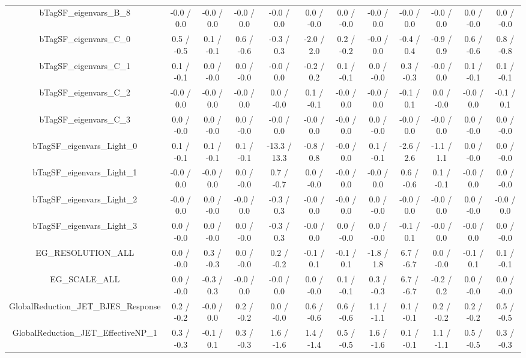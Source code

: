 \begin{table}[htbp]
\begin{center}
\begin{tabular}{|c|c|c|c|c|c|c|c|c|c|c|c|}
  bTagSF_eigenvars_B_8 & -0.0 / 0.0 & -0.0 / 0.0 & -0.0 / 0.0 & -0.0 / 0.0 & 0.0 / -0.0 & 0.0 / -0.0 & -0.0 / 0.0 & -0.0 / 0.0 & -0.0 / 0.0 & 0.0 / -0.0 & 0.0 / -0.0 \\ 
  bTagSF_eigenvars_C_0 & 0.5 / -0.5 & 0.1 / -0.1 & 0.6 / -0.6 & -0.3 / 0.3 & -2.0 / 2.0 & 0.2 / -0.2 & -0.0 / 0.0 & -0.4 / 0.4 & -0.9 / 0.9 & 0.6 / -0.6 & 0.8 / -0.8 \\ 
  bTagSF_eigenvars_C_1 & 0.1 / -0.1 & 0.0 / -0.0 & 0.0 / -0.0 & -0.0 / 0.0 & -0.2 / 0.2 & 0.1 / -0.1 & 0.0 / -0.0 & 0.3 / -0.3 & -0.0 / 0.0 & 0.1 / -0.1 & 0.1 / -0.1 \\ 
  bTagSF_eigenvars_C_2 & -0.0 / 0.0 & -0.0 / 0.0 & -0.0 / 0.0 & 0.0 / -0.0 & 0.1 / -0.1 & -0.0 / 0.0 & -0.0 / 0.0 & -0.1 / 0.1 & 0.0 / -0.0 & -0.0 / 0.0 & -0.1 / 0.1 \\ 
  bTagSF_eigenvars_C_3 & 0.0 / -0.0 & 0.0 / -0.0 & 0.0 / -0.0 & -0.0 / 0.0 & -0.0 / 0.0 & -0.0 / 0.0 & 0.0 / -0.0 & -0.0 / 0.0 & -0.0 / 0.0 & 0.0 / -0.0 & 0.0 / -0.0 \\ 
  bTagSF_eigenvars_Light_0 & 0.1 / -0.1 & 0.1 / -0.1 & 0.1 / -0.1 & -13.3 / 13.3 & -0.8 / 0.8 & -0.0 / 0.0 & 0.1 / -0.1 & -2.6 / 2.6 & -1.1 / 1.1 & 0.0 / -0.0 & 0.0 / -0.0 \\ 
  bTagSF_eigenvars_Light_1 & -0.0 / 0.0 & -0.0 / 0.0 & 0.0 / -0.0 & 0.7 / -0.7 & 0.0 / -0.0 & -0.0 / 0.0 & -0.0 / 0.0 & 0.6 / -0.6 & 0.1 / -0.1 & -0.0 / 0.0 & 0.0 / -0.0 \\ 
  bTagSF_eigenvars_Light_2 & -0.0 / 0.0 & 0.0 / -0.0 & -0.0 / 0.0 & -0.3 / 0.3 & -0.0 / 0.0 & -0.0 / 0.0 & 0.0 / -0.0 & -0.0 / 0.0 & -0.0 / 0.0 & 0.0 / -0.0 & -0.0 / 0.0 \\ 
  bTagSF_eigenvars_Light_3 & 0.0 / -0.0 & 0.0 / -0.0 & 0.0 / -0.0 & -0.3 / 0.3 & -0.0 / 0.0 & 0.0 / -0.0 & 0.0 / -0.0 & -0.1 / 0.1 & -0.0 / 0.0 & -0.0 / 0.0 & 0.0 / -0.0 \\ 
  EG_RESOLUTION_ALL & 0.0 / -0.0 & 0.3 / -0.3 & 0.0 / -0.0 & 0.2 / -0.2 & -0.1 / 0.1 & -0.1 / 0.1 & -1.8 / 1.8 & 6.7 / -6.7 & 0.0 / -0.0 & -0.1 / 0.1 & 0.1 / -0.1 \\ 
  EG_SCALE_ALL & 0.0 / -0.0 & -0.3 / 0.3 & -0.0 / 0.0 & -0.0 / 0.0 & 0.0 / -0.0 & 0.1 / -0.1 & 0.3 / -0.3 & 6.7 / -6.7 & -0.2 / 0.2 & 0.0 / -0.0 & 0.0 / -0.0 \\ 
  GlobalReduction_JET_BJES_Response & 0.2 / -0.2 & -0.0 / 0.0 & 0.2 / -0.2 & 0.0 / -0.0 & 0.6 / -0.6 & 0.6 / -0.6 & 1.1 / -1.1 & 0.1 / -0.1 & 0.2 / -0.2 & 0.2 / -0.2 & 0.5 / -0.5 \\ 
  GlobalReduction_JET_EffectiveNP_1 & 0.3 / -0.3 & -0.1 / 0.1 & 0.3 / -0.3 & 1.6 / -1.6 & 1.4 / -1.4 & 0.5 / -0.5 & 1.6 / -1.6 & 0.1 / -0.1 & 1.1 / -1.1 & 0.5 / -0.5 & 0.3 / -0.3 \\ 

\end{tabular}
\end{center}
\end{table}
